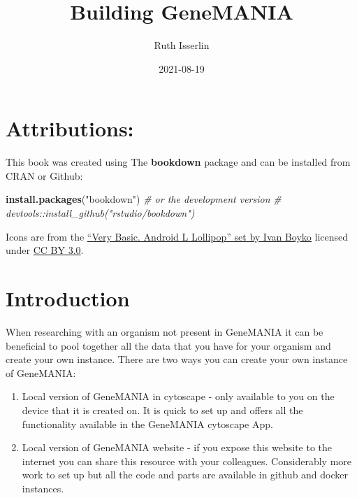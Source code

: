 \documentclass[]{book}
\title{Building GeneMANIA}
\author{Ruth Isserlin}
\date{2021-08-19}
\newenvironment{Shaded}{\begin{snugshade}}{\end{snugshade}}
\newcommand{\KeywordTok}[1]{\textcolor[rgb]{0.13,0.29,0.53}{\textbf{#1}}}
\newcommand{\StringTok}[1]{\textcolor[rgb]{0.31,0.60,0.02}{#1}}
\newcommand{\CommentTok}[1]{\textcolor[rgb]{0.56,0.35,0.01}{\textit{#1}}}
\newcommand{\NormalTok}[1]{#1}
\providecommand{\tightlist}{%
  \setlength{\itemsep}{0pt}\setlength{\parskip}{0pt}}
\begin{document}
\maketitle

{
\setcounter{tocdepth}{1}
\tableofcontents
}
\chapter{Attributions:}\label{attributions}

This book was created using The \textbf{bookdown}\citep{xie2015} package
and can be installed from CRAN or Github:

\begin{Shaded}
\begin{Highlighting}[]
\KeywordTok{install.packages}\NormalTok{(}\StringTok{"bookdown"}\NormalTok{)}
\CommentTok{# or the development version}
\CommentTok{# devtools::install_github("rstudio/bookdown")}
\end{Highlighting}
\end{Shaded}

Icons are from the
\href{https://www.iconfinder.com/iconsets/very-basic-android-l-lollipop}{``Very
Basic. Android L Lollipop'' set by Ivan Boyko} licensed under
\href{https://creativecommons.org/licenses/by/3.0/}{CC BY 3.0}.

\chapter{Introduction}\label{intro}

When researching with an organism not present in
GeneMANIA\citep{genemania} it can be beneficial to pool together all the
data that you have for your organism and create your own instance. There
are two ways you can create your own instance of GeneMANIA:

\begin{enumerate}
\def\labelenumi{\arabic{enumi}.}
\tightlist
\item
  Local version of GeneMANIA in cytoscape - only available to you on the
  device that it is created on. It is quick to set up and offers all the
  functionality available in the GeneMANIA cytoscape App.
\item
  Local version of GeneMANIA website - if you expose this website to the
  internet you can share this resource with your colleagues.
  Considerably more work to set up but all the code and parts are
  available in github and docker instances.
\end{enumerate}
\end{document}
